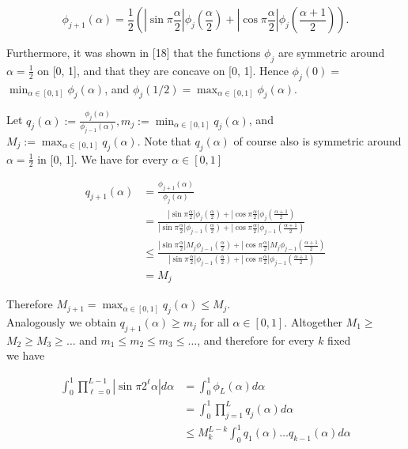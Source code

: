 \documentclass[10pt]{article}
\begin{document}
$$
\phi_{j+1}(\alpha)=\frac{1}{2}\left(\left|\sin \pi \frac{\alpha}{2}\right| \phi_{j}\left(\frac{\alpha}{2}\right)+\left|\cos \pi \frac{\alpha}{2}\right| \phi_{j}\left(\frac{\alpha+1}{2}\right)\right) .
$$

Furthermore, it was shown in [18] that the functions $\phi_{j}$ are symmetric around $\alpha=\frac{1}{2}$ on [0, 1], and that they are concave on [0, 1]. Hence $\phi_{j}(0)=$ $\min _{\alpha \in[0,1]} \phi_{j}(\alpha)$, and $\phi_{j}(1 / 2)=\max _{\alpha \in[0,1]} \phi_{j}(\alpha)$.

Let $q_{j}(\alpha):=\frac{\phi_{j}(\alpha)}{\phi_{j-1}(\alpha)}, m_{j}:=\min _{\alpha \in[0,1]} q_{j}(\alpha)$, and $M_{j}:=\max _{\alpha \in[0,1]} q_{j}(\alpha)$. Note that $q_{j}(\alpha)$ of course also is symmetric around $\alpha=\frac{1}{2}$ in [0, 1]. We have for every $\alpha \in[0,1]$

$$
\begin{aligned}
q_{j+1}(\alpha) & =\frac{\phi_{j+1}(\alpha)}{\phi_{j}(\alpha)} \\
& =\frac{\left|\sin \pi \frac{\alpha}{2}\right| \phi_{j}\left(\frac{\alpha}{2}\right)+\left|\cos \pi \frac{\alpha}{2}\right| \phi_{j}\left(\frac{\alpha+1}{2}\right)}{\left|\sin \pi \frac{\alpha}{2}\right| \phi_{j-1}\left(\frac{\alpha}{2}\right)+\left|\cos \pi \frac{\alpha}{2}\right| \phi_{j-1}\left(\frac{\alpha+1}{2}\right)} \\
& \leqslant \frac{\left|\sin \pi \frac{\alpha}{2}\right| M_{j} \phi_{j-1}\left(\frac{\alpha}{2}\right)+\left|\cos \pi \frac{\alpha}{2}\right| M_{j} \phi_{j-1}\left(\frac{\alpha+1}{2}\right)}{\left|\sin \pi \frac{\alpha}{2}\right| \phi_{j-1}\left(\frac{\alpha}{2}\right)+\left|\cos \pi \frac{\alpha}{2}\right| \phi_{j-1}\left(\frac{\alpha+1}{2}\right)} \\
& =M_{j}
\end{aligned}
$$

Therefore $M_{j+1}=\max _{\alpha \in[0,1]} q_{j}(\alpha) \leqslant M_{j}$.\\
Analogously we obtain $q_{j+1}(\alpha) \geqslant m_{j}$ for all $\alpha \in[0,1]$. Altogether $M_{1} \geqslant$ $M_{2} \geqslant M_{3} \geqslant \ldots$ and $m_{1} \leqslant m_{2} \leqslant m_{3} \leqslant \ldots$, and therefore for every $k$ fixed\\
we have

$$
\begin{aligned}
\int_{0}^{1} \prod_{\ell=0}^{L-1}\left|\sin \pi 2^{\ell} \alpha\right| d \alpha & =\int_{0}^{1} \phi_{L}(\alpha) d \alpha \\
& =\int_{0}^{1} \prod_{j=1}^{L} q_{j}(\alpha) d \alpha \\
& \leqslant M_{k}^{L-k} \int_{0}^{1} q_{1}(\alpha) \ldots q_{k-1}(\alpha) d \alpha
\end{aligned}
$$
\end{document}
